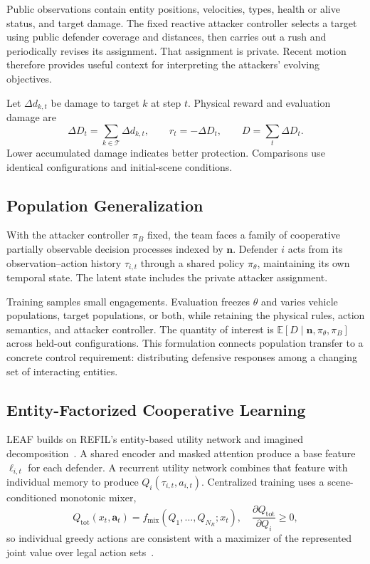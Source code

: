 Public observations contain entity positions, velocities, types, health or alive status, and target damage. The fixed reactive attacker controller selects a target using public defender coverage and distances, then carries out a rush and periodically revises its assignment. That assignment is private. Recent motion therefore provides useful context for interpreting the attackers' evolving objectives.

Let $\Delta d_{k,t}$ be damage to target $k$ at step $t$. Physical reward and evaluation damage are
\begin{equation}
\Delta D_t=\sum_{k\in\mathcal T}\Delta d_{k,t},\qquad
r_t=-\Delta D_t,\qquad D=\sum_t\Delta D_t.
\label{eq:damage}
\end{equation}
Lower accumulated damage indicates better protection. Comparisons use identical configurations and initial-scene conditions.

\subsection{Population Generalization}
With the attacker controller $\pi_B$ fixed, the team faces a family of cooperative partially observable decision processes indexed by $\mathbf n$. Defender $i$ acts from its observation--action history $\tau_{i,t}$ through a shared policy $\pi_\theta$, maintaining its own temporal state. The latent state includes the private attacker assignment.

Training samples small engagements. Evaluation freezes $\theta$ and varies vehicle populations, target populations, or both, while retaining the physical rules, action semantics, and attacker controller. The quantity of interest is $\mathbb E[D\mid\mathbf n,\pi_\theta,\pi_B]$ across held-out configurations. This formulation connects population transfer to a concrete control requirement: distributing defensive responses among a changing set of interacting entities.

\subsection{Entity-Factorized Cooperative Learning}
LEAF builds on REFIL's entity-based utility network and imagined decomposition~\cite{iqbal2021refil}. A shared encoder and masked attention produce a base feature $\ell_{i,t}$ for each defender. A recurrent utility network combines that feature with individual memory to produce $Q_i(\tau_{i,t},a_{i,t})$. Centralized training uses a scene-conditioned monotonic mixer,
\begin{equation}
Q_{\mathrm{tot}}(x_t,\boldsymbol a_t)=f_{\mathrm{mix}}(Q_1,\ldots,Q_{N_R};x_t),
\quad\frac{\partial Q_{\mathrm{tot}}}{\partial Q_i}\geq0,
\end{equation}
so individual greedy actions are consistent with a maximizer of the represented joint value over legal action sets~\cite{rashid2018qmix}.

